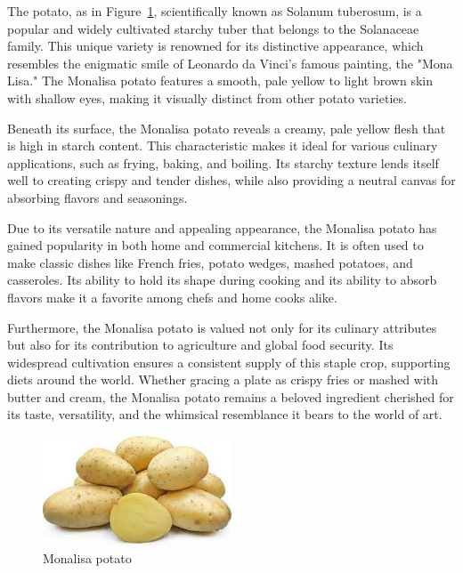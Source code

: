 




The  potato, as in Figure~\ref{fig:potato_monalisa}, scientifically known as Solanum tuberosum, is a popular and widely cultivated starchy tuber that belongs to the Solanaceae family. This unique variety is renowned for its distinctive appearance, which resembles the enigmatic smile of Leonardo da Vinci's famous painting, the "Mona Lisa." The Monalisa potato features a smooth, pale yellow to light brown skin with shallow eyes, making it visually distinct from other potato varieties.

Beneath its surface, the Monalisa potato reveals a creamy, pale yellow flesh that is high in starch content. This characteristic makes it ideal for various culinary applications, such as frying, baking, and boiling. Its starchy texture lends itself well to creating crispy and tender dishes, while also providing a neutral canvas for absorbing flavors and seasonings.

Due to its versatile nature and appealing appearance, the Monalisa potato has gained popularity in both home and commercial kitchens. It is often used to make classic dishes like French fries, potato wedges, mashed potatoes, and casseroles. Its ability to hold its shape during cooking and its ability to absorb flavors make it a favorite among chefs and home cooks alike.

Furthermore, the Monalisa potato is valued not only for its culinary attributes but also for its contribution to agriculture and global food security. Its widespread cultivation ensures a consistent supply of this staple crop, supporting diets around the world. Whether gracing a plate as crispy fries or mashed with butter and cream, the Monalisa potato remains a beloved ingredient cherished for its taste, versatility, and the whimsical resemblance it bears to the world of art.


\begin{figure}[!htbp]
    \centering
    \includegraphics[width=0.5\textwidth]{Parts/PartExample/Chapters/potato_folder/figures/potato_monalisa.jpeg}
    \caption{Monalisa potato}
    \label{fig:potato_monalisa}
\end{figure}


